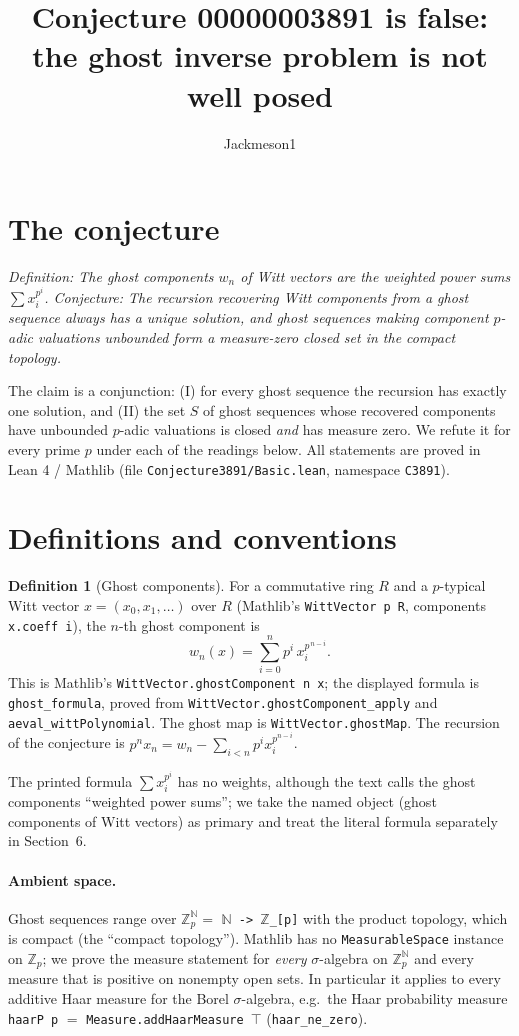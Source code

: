 \documentclass[11pt]{article}
\title{Conjecture 00000003891 is false:\\ the ghost inverse problem is not well posed}
\author{Jackmeson1}
\date{}
\theoremstyle{definition}
\newtheorem{definition}[theorem]{Definition}
\newcommand{\Zp}{\mathbb{Z}_p}
\newcommand{\lean}[1]{\texttt{#1}}
\begin{document}
\maketitle

\section{The conjecture}

\emph{Definition: The ghost components $w_n$ of Witt vectors are the weighted power sums
$\sum x_i^{p^i}$. Conjecture: The recursion recovering Witt components from a ghost sequence always has
a unique solution, and ghost sequences making component $p$-adic valuations unbounded form a
measure-zero closed set in the compact topology.}

The claim is a conjunction: (I) for every ghost sequence the recursion has exactly one solution,
and (II) the set $S$ of ghost sequences whose recovered components have unbounded $p$-adic
valuations is closed \emph{and} has measure zero. We refute it for every prime $p$ under each of
the readings below. All statements are proved in Lean 4 / Mathlib (file \lean{Conjecture3891/Basic.lean},
namespace \lean{C3891}).

\section{Definitions and conventions}

\begin{definition}[Ghost components]
For a commutative ring $R$ and a $p$-typical Witt vector $x=(x_0,x_1,\dots)$ over $R$ (Mathlib's
\lean{WittVector p R}, components \lean{x.coeff i}), the $n$-th ghost component is
\[ w_n(x)=\sum_{i=0}^{n} p^i\,x_i^{p^{\,n-i}} . \]
This is Mathlib's \lean{WittVector.ghostComponent n x}; the displayed formula is
\lean{ghost\_formula}, proved from \lean{WittVector.ghostComponent\_apply} and
\lean{aeval\_wittPolynomial}. The ghost map is \lean{WittVector.ghostMap}. The recursion of the
conjecture is $p^n x_n = w_n-\sum_{i<n}p^i x_i^{p^{n-i}}$.
\end{definition}

The printed formula $\sum x_i^{p^i}$ has no weights, although the text calls the ghost components
``weighted power sums''; we take the named object (ghost components of Witt vectors) as primary and
treat the literal formula separately in Section~6.

\paragraph{Ambient space.} Ghost sequences range over $\Zp^{\mathbb N}=$ \lean{$\mathbb N$ -> $\mathbb Z$\_[p]}
with the product topology, which is compact (the ``compact topology''). Mathlib has no
\lean{MeasurableSpace} instance on $\Zp$; we prove the measure statement for \emph{every}
$\sigma$-algebra on $\Zp^{\mathbb N}$ and every measure that is positive on nonempty open sets. In particular it
applies to every additive Haar measure for the Borel $\sigma$-algebra, e.g.\ the Haar probability measure
\lean{haarP p} $=$ \lean{Measure.addHaarMeasure $\top$} (\lean{haar\_ne\_zero}).
\end{document}
